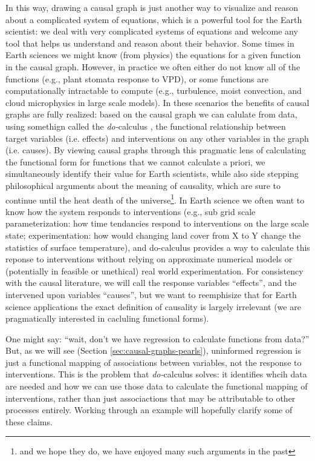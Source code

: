 \documentclass[12pt]{article}
\begin{document}
In this way, drawing a causal graph is just another way to visualize
and reason about a complicated system of equations, which is a
powerful tool for the Earth scientist: we deal with very complicated
systems of equations and welcome any tool that helps us understand and
reason about their behavior. Some times in Earth sciences we might
know (from physics) the equations for a given function in the causal
graph. However, in practice we often either do not know all of the
functions (e.g., plant stomata response to VPD), or some functions are
computationally intractable to compute (e.g., turbulence, moist
convection, and cloud microphysics in large scale models). In these
scenarios the benefits of causal graphs are fully realized: based on
the causal graph we can calulate from data, using somethign called the
\textit{do-}calculus \citep{pearl-1994-do-calculus}, the functional
relationship between target variables (i.e. effects) and interventions
on any other variables in the graph (i.e. causes). By viewing causal
graphs through this pragmatic lens of calculating the functional form
for functions that we cannot calculate a priori, we simultaneously
identify their value for Earth scientists, while also side stepping
philosophical arguments about the meaning of causality, which are sure
to continue until the heat death of the universe\footnote{and we hope
  they do, we have enjoyed many such arguments in the past}. In Earth
science we often want to know how the system responds to interventions
(e.g., sub grid scale parameterization: how time tendancies respond to
interventions on the large scale state; experimentation: how would
changing land cover from X to Y change the statistics of surface
temperature), and do-calculus provides a way to calculate this reponse
to interventions without relying on approximate numerical models or
(potentially in feasible or unethical) real world experimentation. For
consistency with the causal literature, we will call the response
variables ``effects'', and the intervened upon variables ``causes'',
but we want to reemphisize that for Earth science applications the
exact definition of causality is largely irrelevant (we are
pragmatically interested in cacluling functional forms).

One might say: ``wait, don't we have regression to calculate functions
from data?'' But, as we will see (Section
\ref{sec:causal-graphs-pearls}), uninformed regression is just a
functional mapping of associations between variables, not the response
to interventions. This is the problem that \textit{do-}calculus
solves: it identifies whcih data are needed and how we can use those
data to calculate the functional mapping of interventions, rather than
just associactions that may be attributable to other processes
entirely. Working through an example will hopefully clarify some of
these claims.
\end{document}

